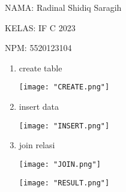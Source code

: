 \documentclass[12pt,a4paper]{article}
\date{}
\begin{document}
  NAMA: Radinal Shidiq Saragih

  KELAS: IF C 2023

  NPM: 5520123104

\begin{enumerate}

  \item create table

  \begin{center}

  \texttt{[image: "CREATE.png"]}

  \end{center}

  \item insert data

  \begin{center}

  \texttt{[image: "INSERT.png"]}

  \end{center}

  \item join relasi

  \begin{center}

  \texttt{[image: "JOIN.png"]}

  \texttt{[image: "RESULT.png"]}

  \end{center}
\end{enumerate}
\end{document}
